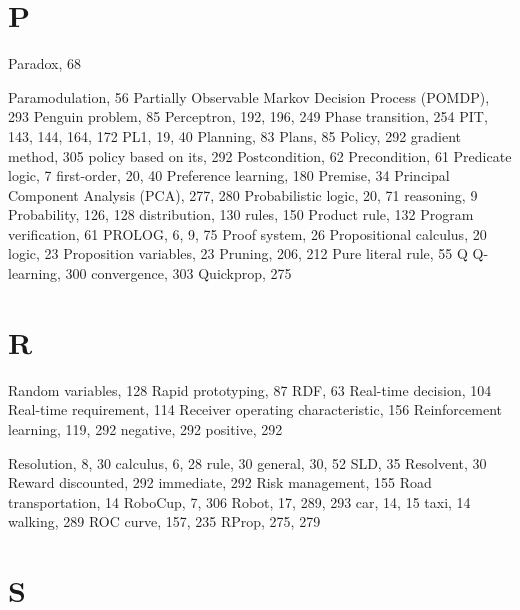 \documentclass[10pt]{book}
\begin{document}
\begin{center}
\section{P}

Paradox, 68

Paramodulation, 56
Partially Observable Markov Decision Process (POMDP), 293
Penguin problem, 85
Perceptron, 192, 196, 249
Phase transition, 254
PIT, 143, 144, 164, 172
PL1, 19, 40
Planning, 83
Plans, 85
Policy, 292
gradient method, 305
policy based on its, 292
Postcondition, 62
Precondition, 61
Predicate logic, 7
first-order, 20, 40
Preference learning, 180
Premise, 34
Principal Component Analysis (PCA), 277, 280
Probabilistic
logic, 20, 71
reasoning, 9
Probability, 126, 128
distribution, 130
rules, 150
Product rule, 132
Program verification, 61
PROLOG, 6, 9, 75
Proof system, 26
Propositional
calculus, 20
logic, 23
Proposition variables, 23
Pruning, 206, 212
Pure literal rule, 55
Q
Q-learning, 300
convergence, 303
Quickprop, 275

\section{R}

Random variables, 128
Rapid prototyping, 87
RDF, 63
Real-time decision, 104
Real-time requirement, 114
Receiver operating characteristic, 156
Reinforcement
learning, 119, 292
negative, 292
positive, 292

Resolution, 8, 30
calculus, 6, 28
rule, 30
general, 30, 52
SLD, 35
Resolvent, 30
Reward
discounted, 292
immediate, 292
Risk management, 155
Road transportation, 14
RoboCup, 7, 306
Robot, 17, 289, 293
car, 14, 15
taxi, 14
walking, 289
ROC curve, 157, 235
RProp, 275, 279

\section{S}


\end{center}
\end{document}
